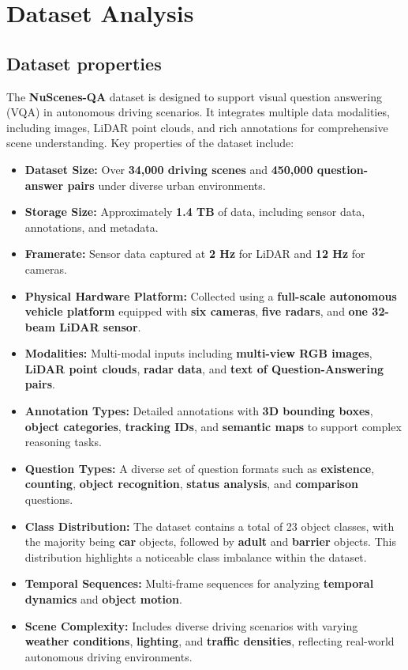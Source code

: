 \documentclass{article} %
\begin{document}
	
	
	\clearpage
	\section{ Dataset Analysis }
	\subsection{  Dataset properties} 
	The \textbf{NuScenes-QA} dataset is designed to support visual question answering (VQA) in autonomous driving scenarios. It integrates multiple data modalities, including images, LiDAR point clouds, and rich annotations for comprehensive scene understanding. Key properties of the dataset include:
	
	\begin{itemize}
		\item \textbf{Dataset Size:} Over \textbf{34,000 driving scenes} and \textbf{450,000 question-answer pairs} under diverse urban environments.
		\item \textbf{Storage Size:} Approximately \textbf{1.4 TB} of data, including sensor data, annotations, and metadata.
		\item \textbf{Framerate:} Sensor data captured at \textbf{2 Hz} for LiDAR and \textbf{12 Hz} for cameras.
		\item \textbf{Physical Hardware Platform:} Collected using a \textbf{full-scale autonomous vehicle platform} equipped with \textbf{six cameras}, \textbf{five radars}, and \textbf{one 32-beam LiDAR sensor}.
		\item \textbf{Modalities:} Multi-modal inputs including \textbf{multi-view RGB images}, \textbf{LiDAR point clouds}, \textbf{radar data}, and \textbf{text of Question-Answering pairs}.
		\item \textbf{Annotation Types:} Detailed annotations with \textbf{3D bounding boxes}, \textbf{object categories}, \textbf{tracking IDs}, and \textbf{semantic maps} to support complex reasoning tasks.
		\item \textbf{Question Types:} A diverse set of question formats such as \textbf{existence}, \textbf{counting}, \textbf{object recognition}, \textbf{status analysis}, and \textbf{comparison} questions.
		\item \textbf{Class Distribution:} The dataset contains a total of 23 object classes, with the majority being \textbf{car} objects, followed by \textbf{adult} and \textbf{barrier} objects. This distribution highlights a noticeable class imbalance within the dataset.    
		\item \textbf{Temporal Sequences:} Multi-frame sequences for analyzing \textbf{temporal dynamics} and \textbf{object motion}.
		\item \textbf{Scene Complexity:} Includes diverse driving scenarios with varying \textbf{weather conditions}, \textbf{lighting}, and \textbf{traffic densities}, reflecting real-world autonomous driving environments.
	\end{itemize}
	
\end{document}
